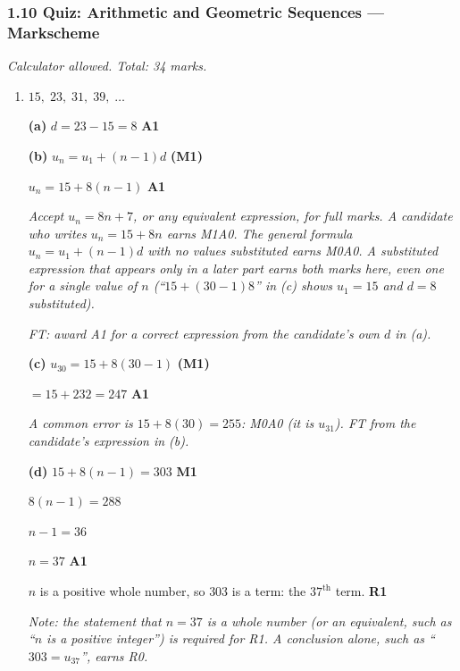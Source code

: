 \documentclass[12pt, twoside]{article}
\begin{document}
\subsubsection*{1.10 Quiz: Arithmetic and Geometric Sequences --- Markscheme}

\emph{Calculator allowed. Total: 34 marks.}

\begin{enumerate}[itemsep=0.3cm]

\item[1.] [Maximum mark: 8]

$15,\; 23,\; 31,\; 39,\; \ldots$

\medskip

\textbf{(a)} $d = 23 - 15 = 8$ \hfill \textbf{A1}

\medskip

\textbf{(b)} $u_{n} = u_{1} + (n - 1)d$ \hfill \textbf{(M1)}

$u_{n} = 15 + 8(n - 1)$ \hfill \textbf{A1}

\emph{Accept $u_{n} = 8n + 7$, or any equivalent expression, for full
marks. A candidate who writes $u_{n} = 15 + 8n$ earns M1A0. The general
formula $u_{n} = u_{1} + (n - 1)d$ with no values substituted earns M0A0.
A substituted expression that appears only in a later part earns both
marks here, even one for a single value of $n$ (``$15 + (30 - 1)8$'' in
(c) shows $u_{1} = 15$ and $d = 8$ substituted).}

\emph{FT: award A1 for a correct expression from the candidate's own $d$
in (a).}

\medskip

\textbf{(c)} $u_{30} = 15 + 8(30 - 1)$ \hfill \textbf{(M1)}

$= 15 + 232 = 247$ \hfill \textbf{A1}

\emph{A common error is $15 + 8(30) = 255$: M0A0 (it is
$u_{31}$). FT from the candidate's expression in (b).}

\medskip

\textbf{(d)} $15 + 8(n - 1) = 303$ \hfill \textbf{M1}

$8(n - 1) = 288$

$n - 1 = 36$

$n = 37$ \hfill \textbf{A1}

$n$ is a positive whole number, so $303$ is a term: the
$37^{\text{th}}$ term. \hfill \textbf{R1}

\emph{Note: the statement that $n = 37$ is a whole number (or an
equivalent, such as ``$n$ is a positive integer'') is required for R1. A
conclusion alone, such as ``$303 = u_{37}$'', earns R0.}


\end{enumerate}
\end{document}
